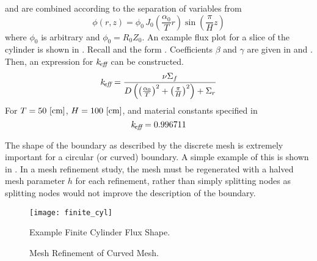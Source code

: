    and  are combined according to
  the separation of variables from 
  \begin{equation}
    \label{eq:analytic_finite_cyl}
    \phi(r,z) = \phi_0 \, 
      J_0\left(\frac{\alpha_0}{T} r\right) \sin\left(\frac{\pi}{H} z \right)
  \end{equation}
  where $\phi_0$ is arbitrary and $\phi_0 = R_0 Z_0$.
  An example flux plot for a slice of the cylinder is shown in 
  . Recall  and the form 
  . Coefficients $\beta$ and $\gamma$ are given in 
   and . Then, an expression
  for $k_{\!\mbox{\scriptsize \em eff}}$ can be constructed.
  \begin{equation}
    \label{eq:keff_finite_cyl}
    k_{\!\mbox{\scriptsize \em eff}} = \frac{\nu \Sigma_f}{D \left( \left(\frac{\alpha_0}{T}\right)^2 +
    \left( \frac{\pi}{H}\right)^2 \right) + \Sigma_r}
  \end{equation}
  For $T = 50 \,\left[\text{{cm}}\right]$, $H = 100 \,\left[\text{{cm}}\right]$, and material constants
  specified in 
  \begin{equation}
    k_{\!\mbox{\scriptsize \em eff}} = 0.996711
  \end{equation}
  
  The shape of the boundary as described by the discrete mesh is extremely 
  important for a circular (or curved) boundary. A simple example of this is 
  shown in . In a mesh refinement study, the mesh must 
  be regenerated with a halved mesh parameter $h$ for each refinement, rather 
  than simply splitting nodes as splitting nodes would not improve the 
  description of the boundary.

  \begin{figure}
    \centering
    \texttt{[image: finite\_cyl]}
    \caption{Example Finite Cylinder Flux Shape.}
    \label{fig:finite_cyl}
  \end{figure}

  \begin{figure}
    \centering
    \vspace{0.2in}
    \caption{Mesh Refinement of Curved Mesh.}
    \label{fig:circle_meshes}
  \end{figure}

